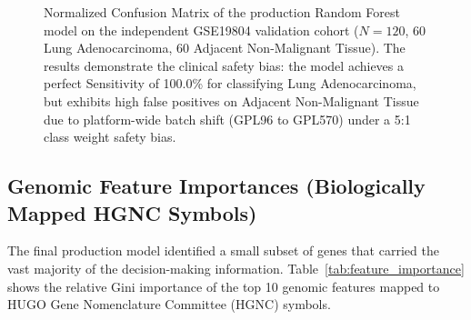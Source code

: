 \documentclass[journal,10pt]{IEEEtran}
\begin{document}
\begin{figure}[htbp]
\centering
{}
\caption{Normalized Confusion Matrix of the production Random Forest model on the independent GSE19804 validation cohort ($N=120$, $60$ Lung Adenocarcinoma, $60$ Adjacent Non-Malignant Tissue). The results demonstrate the clinical safety bias: the model achieves a perfect Sensitivity of 100.0\% for classifying Lung Adenocarcinoma, but exhibits high false positives on Adjacent Non-Malignant Tissue due to platform-wide batch shift (GPL96 to GPL570) under a 5:1 class weight safety bias.}
\label{fig:confusion_matrix}
\end{figure}

\subsection{Genomic Feature Importances (Biologically Mapped HGNC Symbols)}
The final production model identified a small subset of genes that carried the vast majority of the decision-making information. Table~\ref{tab:feature_importance} shows the relative Gini importance of the top 10 genomic features mapped to HUGO Gene Nomenclature Committee (HGNC) symbols.
\end{document}
